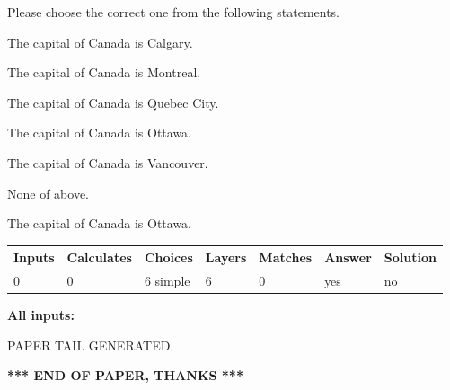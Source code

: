 \documentclass[12pt]{article}
\begin{document}
  
Please choose the correct one from the following statements.
 
 
The capital of Canada is Calgary.
 
 
The capital of Canada is Montreal.
 
 
The capital of Canada is Quebec City.
 
 
The capital of Canada is Ottawa.
 
 
The capital of Canada is Vancouver.
 
 
 None of above.
 
 
\noindent{}
 
 
The capital of Canada is Ottawa.
 
 
\noindent{}
 
 
   
   
   
   
\noindent\begin{tabular}{|l|l|l|l|l|l|l|}
 \hline
Inputs & Calculates & Choices & Layers & Matches & Answer & Solution \\ \hline
 0  & 
 0  & 
 6
  simple  
  & 
 6  & 
 0  & 
  yes & 
  no 
  \\ \hline
 \end{tabular}
   
   
   
   
\noindent{}
   
   
   
   
\noindent\vspace{0.1in}\hspace{-0.08in} {\textbf{\Large{All inputs: }}}
   
   
   
   
   
   
 \vspace{0.2in}
 
   
   
\vspace{2.0in} PAPER TAIL GENERATED.
   
   
   
   
\vspace{1.0in} 
{\textbf{\large{ *** END OF PAPER, THANKS *** }}} 
   
\end{document}
